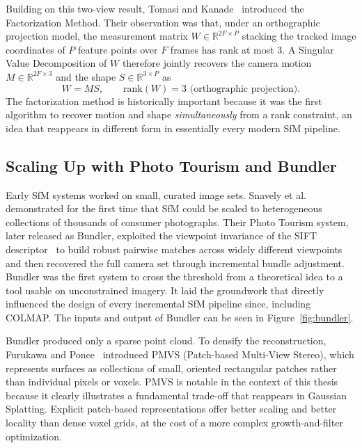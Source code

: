 Building on this two-view result, Tomasi and Kanade~\cite{Tomasi1992} introduced
the Factorization Method. Their observation was that, under an orthographic
projection model, the measurement matrix $W \in \mathbb{R}^{2F \times P}$
stacking the tracked image coordinates of $P$ feature points over $F$ frames has
rank at most $3$. A Singular Value Decomposition of $W$ therefore jointly
recovers the camera motion $M \in \mathbb{R}^{2F \times 3}$ and the shape $S \in
\mathbb{R}^{3 \times P}$ as
\begin{equation}
    W = M S, \qquad \text{rank}(W) = 3 \text{ (orthographic projection)}.
\end{equation}
The factorization method is historically important because it was the first
algorithm to recover motion and shape \emph{simultaneously} from a rank
constraint, an idea that reappears in different form in essentially every modern
SfM pipeline.

\subsection{Scaling Up with Photo Tourism and Bundler}

Early SfM systems worked on small, curated image sets. Snavely et
al.~\cite{10.1145/1179352.1141964} demonstrated for the first time that SfM
could be scaled to heterogeneous collections of thousands of consumer
photographs. Their Photo Tourism system, later released as Bundler, exploited
the viewpoint invariance of the SIFT descriptor~\cite{lowe1999sift} to build
robust pairwise matches across widely different viewpoints and then recovered
the full camera set through incremental bundle adjustment. Bundler was the first
system to cross the threshold from a theoretical idea to a tool usable on
unconstrained imagery. It laid the groundwork that directly influenced the
design of every incremental SfM pipeline since, including COLMAP. The inputs and
output of Bundler can be seen in Figure~\ref{fig:bundler}.

Bundler produced only a sparse point cloud. To densify the reconstruction,
Furukawa and Ponce~\cite{Furukawa2010-ge} introduced PMVS (Patch-based
Multi-View Stereo), which represents surfaces as collections of small, oriented
rectangular patches rather than individual pixels or voxels. PMVS is notable in
the context of this thesis because it clearly illustrates a fundamental
trade-off that reappears in Gaussian Splatting. Explicit patch-based
representations offer better scaling and better locality than dense voxel grids,
at the cost of a more complex growth-and-filter optimization.

